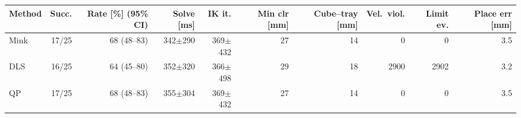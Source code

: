 \begin{tabular}{lrrrrrrrrr}
\toprule
Method & Succ. & Rate [\%] (95\% CI) & Solve [ms] & IK it. & Min clr [mm] & Cube--tray [mm] & Vel.\ viol. & Limit ev. & Place err [mm]\\
\midrule
Mink & 17/25 & 68 (48--83) & 342$\pm$290 & 369$\pm$432 & 27 & 14 & 0 & 0 & 3.5\\
DLS & 16/25 & 64 (45--80) & 352$\pm$320 & 366$\pm$498 & 29 & 18 & 2900 & 2902 & 3.2\\
QP & 17/25 & 68 (48--83) & 355$\pm$304 & 369$\pm$432 & 27 & 14 & 0 & 0 & 3.5\\
\bottomrule
\end{tabular}
